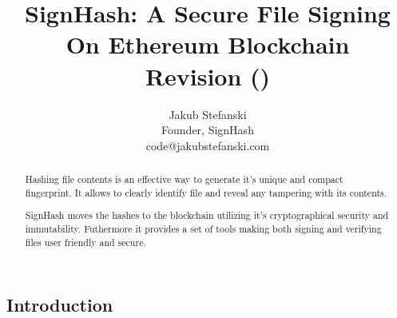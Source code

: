 \documentclass[9pt,oneside]{amsart}
\title{
	SignHash: A Secure File Signing On Ethereum Blockchain \\
	{\smaller \textbf{Revision (\WhitePaperVersionNumber{})}}
}
\author{
	Jakub Stefanski\\
	Founder, SignHash\\
	code@jakubstefanski.com
}
\begin{document}
\begin{abstract}

Hashing file contents is an effective way to generate it's unique and compact fingerprint.
It allows to clearly identify file and reveal any tampering with its contents.

SignHash moves the hashes to the blockchain utilizing it's cryptographical security and immutability.
Futhermore it provides a set of tools making both signing and verifying files user friendly and secure.

\end{abstract}

\maketitle

\setlength{\columnsep}{20pt}
\begin{multicols}{2}

\section{Introduction}

\end{multicols}
\end{document}
